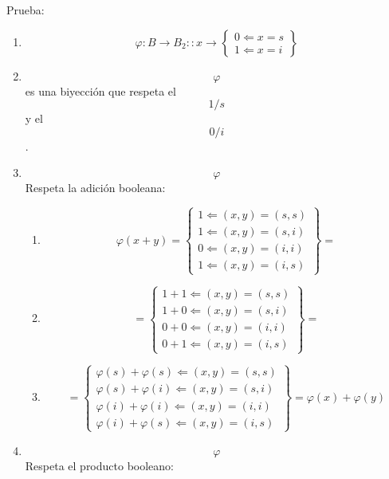 \documentclass[
]{article}
\providecommand{\tightlist}{%
  \setlength{\itemsep}{0pt}\setlength{\parskip}{0pt}}
\begin{document}
\begin{enumerate}
\begin{enumerate}
\begin{enumerate}
      Prueba:

      \begin{enumerate}
      \def\labelenumiv{\arabic{enumiv}.}
      \item
        \[\varphi:{B\rightarrow B_{2}}::{x\rightarrow\begin{Bmatrix}
        {0\Leftarrow{x = s}} \\
        {1\Leftarrow{x = i}}
        \end{Bmatrix}}\]
      \item
        \[\varphi\]es una biyección que respeta el \[1/s\] y el \[0/i\].
      \item
        \[\varphi\]Respeta la adición booleana:

        \begin{enumerate}
        \def\labelenumv{\arabic{enumv}.}
        \tightlist
        \item
          \[\varphi{{{({x + y})} = \begin{Bmatrix}
          {1\Leftarrow{{({x,y})} = {({s,s})}}} \\
          {1\Leftarrow{{({x,y})} = {({s,i})}}} \\
          {0\Leftarrow{{({x,y})} = {({i,i})}}} \\
          {1\Leftarrow{{({x,y})} = {({i,s})}}}
          \end{Bmatrix}} =}\]
        \item
          \[{= \begin{Bmatrix}
          {{1 + 1}\Leftarrow{{({x,y})} = {({s,s})}}} \\
          {{1 + 0}\Leftarrow{{({x,y})} = {({s,i})}}} \\
          {{0 + 0}\Leftarrow{{({x,y})} = {({i,i})}}} \\
          {{0 + 1}\Leftarrow{{({x,y})} = {({i,s})}}}
          \end{Bmatrix}} =\]
        \item
          \[{{= \begin{Bmatrix}
          {\varphi{{(s)} + \varphi}{(s)}\Leftarrow{{({x,y})} = {({s,s})}}} \\
          {\varphi{{(s)} + \varphi}{(i)}\Leftarrow{{({x,y})} = {({s,i})}}} \\
          {\varphi{{(i)} + \varphi}{(i)}\Leftarrow{{({x,y})} = {({i,i})}}} \\
          {\varphi{{(i)} + \varphi}{(s)}\Leftarrow{{({x,y})} = {({i,s})}}}
          \end{Bmatrix}} = \varphi}{{(x)} + \varphi}{(y)}\]
        \end{enumerate}
      \item
        \[\varphi\]Respeta el producto booleano:


\end{enumerate}
\end{enumerate}
\end{enumerate}
\end{enumerate}
\end{document}
